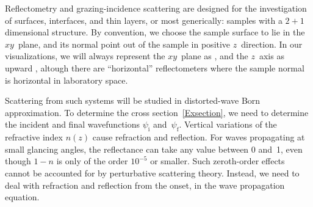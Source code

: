 Reflectometry and grazing-incidence scattering
are designed for the investigation of surfaces, interfaces, and thin layers,
or most generically:
samples with a $2+1$ dimensional structure.
By convention,
we choose the sample surface to lie in the $xy$~plane,
%
and its normal point out of the sample in positive $z$~direction.
%
%
%
%
%
%
%
In our visualizations, we will always represent the $xy$~plane as ,
and the $z$~axis as upward ,
altough there are ``horizontal'' reflectometers
where the sample normal is horizontal in laboratory space.
%

Scattering from such systems will be studied in distorted-wave Born approximation.
To determine the cross section~\cref{Exsection},
we need to determine the incident and final wavefunctions
$\psi_\text{i}$ and~$\psi_\text{f}$.
Vertical variations of the refractive index $n(z)$
%
cause refraction and reflection.
%
%
%
For waves propagating at small glancing angles,
the reflectance can take any value between 0 and~1,
even though $1-n$ is only of the order $10^{-5}$ or smaller.
Such zeroth-order effects cannot be accounted for
by perturbative scattering theory.
Instead, we need to deal with refraction and reflection
from the onset, in the wave propagation equation.

